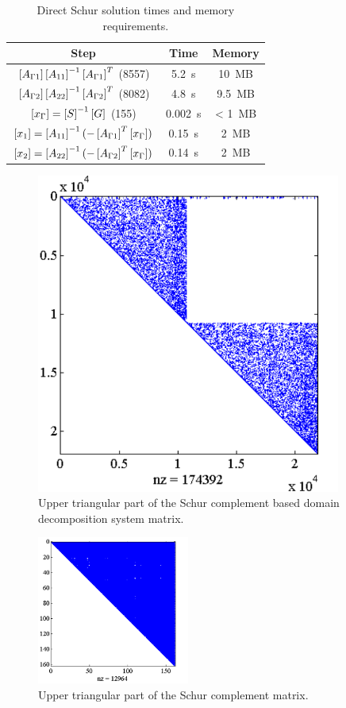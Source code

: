 \begin{table}[ht!]
\begin{center}
\begin{tabular}{|c|c|c|}
\hline 
Step & Time & Memory \\ 
\hline
\hline 
$\left[A_{\Gamma 1}\right] \left[A_{11}\right]^{-1} \left[A_{\Gamma 1}\right]^T$ (8557) & 5.2~s & 10~MB\\ \hline 
$\left[A_{\Gamma 2}\right] \left[A_{22}\right]^{-1} \left[A_{\Gamma 2}\right]^T$ (8082) & 4.8~s & 9.5~MB\\ \hline 
$\left[x_\Gamma\right] = \left[S\right]^{-1} \left[G\right]$ (155) & 0.002~s & < 1~MB\\ \hline 
$\left[x_1\right] = \left[A_{11}\right]^{-1} (-\left[A_{\Gamma 1}\right]^T \left[x_\Gamma\right])$ & 0.15~s &  2~MB\\ \hline 
$\left[x_2\right] = \left[A_{22}\right]^{-1} (-\left[A_{\Gamma 2}\right]^T \left[x_\Gamma\right])$ & 0.14~s &  2~MB\\ \hline 
\end{tabular}
\end{center}
\caption{Direct Schur solution times and memory requirements.}
\label{tab:SchurSol}
\end{table}

\begin{figure}[ht!]
\centering
\includegraphics[width=10cm]{DDSchurMat}
\caption{Upper triangular part of the Schur complement based domain decomposition system matrix.}
\label{fig:DDSchurMat}
\end{figure}

\begin{figure}[ht!]
\centering
\includegraphics[width=5cm]{DDSchurMatS}
\caption{Upper triangular part of the Schur complement matrix.}
\label{fig:DDSchurMatS}
\end{figure}


